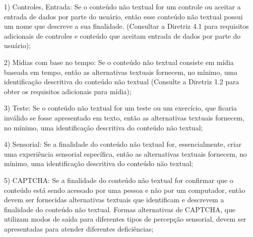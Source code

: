 \documentclass[a4paper]{article}
\begin{document}
\begin{titlepage}
\hspace{.1\textwidth} %
\begin{minipage}{.85\textwidth}
	1) Controles, Entrada: Se o conteúdo não textual for um controle ou aceitar a entrada de dados por parte do usuário, então esse conteúdo não textual possui um nome que descreve a sua finalidade. (Consultar a Diretriz 4.1 para requisitos adicionais de controles e conteúdo que aceitam entrada de dados por parte do usuário);\\
\end{minipage}

\hspace{.1\textwidth} %
\begin{minipage}{.85\textwidth}
	2) Mídias com base no tempo: Se o conteúdo não textual consiste em mídia baseada em tempo, então as alternativas textuais fornecem, no mínimo, uma identificação descritiva do conteúdo não textual (Consulte a Diretriz 1.2 para obter os requisitos adicionais para mídia);\\
\end{minipage}

\hspace{.1\textwidth} %
\begin{minipage}{.85\textwidth}
	3) Teste: Se o conteúdo não textual for um teste ou um exercício, que ficaria inválido se fosse apresentado em texto, então as alternativas textuais fornecem, no mínimo, uma identificação descritiva do conteúdo não textual;\\
\end{minipage}

\hspace{.1\textwidth} %
\begin{minipage}{.85\textwidth}
	4) Sensorial: Se a finalidade do conteúdo não textual for, essencialmente, criar uma experiência sensorial específica, então as alternativas textuais fornecem, no mínimo, uma identificação descritiva do conteúdo não textual;\\
\end{minipage}

\hspace{.1\textwidth} %
\begin{minipage}{.85\textwidth}
	5) CAPTCHA: Se a finalidade do conteúdo não textual for confirmar que o conteúdo está sendo acessado por uma pessoa e não por um computador, então devem ser fornecidas alternativas textuais que identificam e descrevem a finalidade do conteúdo não textual. Formas alternativas de CAPTCHA, que utilizam modos de saída para diferentes tipos de percepção sensorial, devem ser apresentadas para atender diferentes deficiências;\\
\end{minipage}


\end{titlepage}
\end{document}
